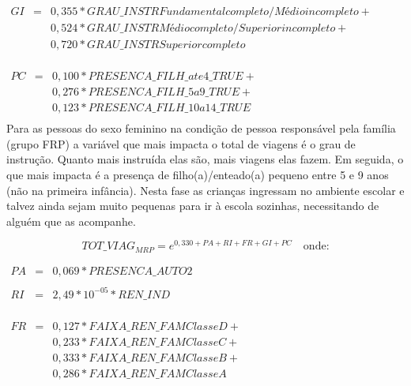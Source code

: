 \begin{math}
\begin{array} {rcl}
GI & = & 0,355*GRAU\_INSTRFundamental completo / Médio incompleto + \\
   &   & 0,524*GRAU\_INSTRMédio completo / Superior incompleto + \\
   &   & 0,720*GRAU\_INSTRSuperior completo \\  
\end{array}
\end{math}

\begin{math}
\begin{array} {rcl}
PC & = & 0,100*PRESENCA\_FILH\_ate4\_TRUE + \\
   &   & 0,276*PRESENCA\_FILH\_5a9\_TRUE +\\
   &   & 0,123*PRESENCA\_FILH\_10a14\_TRUE \\  
\end{array}
\end{math}\\

Para as pessoas do sexo feminino na condição de pessoa responsável pela família (grupo FRP) a variável que mais impacta o total de viagens é o grau de instrução. 
Quanto mais instruída elas são, mais viagens elas fazem.
Em seguida, o que mais impacta é a presença de filho(a)/enteado(a) pequeno entre 5 e 9 anos (não na primeira infância).
Nesta fase as crianças ingressam no ambiente escolar e talvez ainda sejam muito pequenas para ir à escola sozinhas, necessitando de alguém que as acompanhe.

\begin{equation}\label{eq:quasi-poisson-GB} 
TOT\_VIAG _{MRP}= e^{0,330 + PA + RI + FR + GI + PC}
\quad \text{onde:}
\end{equation}

\begin{math}
\begin{array} {rcl}
PA & = & 0,069*PRESENCA\_AUTO2 \\  
   &   & \\
RI & = & 2,49*10^{-05}*REN\_IND \\  
\end{array}
\end{math}

\begin{math}
\begin{array} {rcl}
FR & = & 0,127*FAIXA\_REN\_FAMClasse D + \\
   &   & 0,233*FAIXA\_REN\_FAMClasse C + \\
   &   & 0,333*FAIXA\_REN\_FAMClasse B + \\
   &   & 0,286*FAIXA\_REN\_FAMClasse A \\
\end{array}
\end{math}

